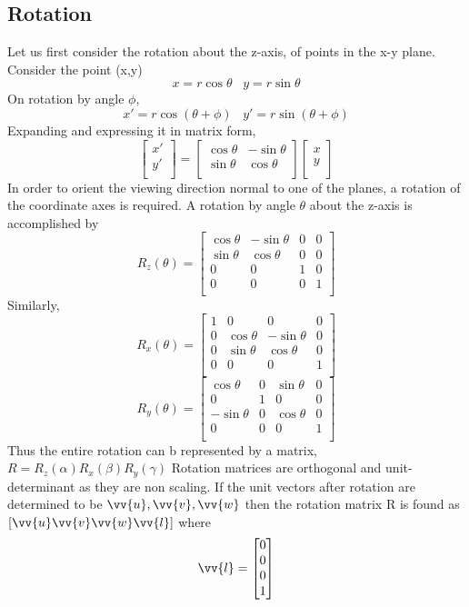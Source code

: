 \documentclass{article}
\begin{document}
\subsection{Rotation}
Let us first consider the rotation about the z-axis, of points in the x-y plane. Consider the point (x,y) 
\[x = r\cos{\theta} \,\,\,\,\, y = r\sin{\theta}\]
On rotation by angle $\phi$,
\[x' = r\cos{(\theta + \phi)} \,\,\,\,\, y' = r\sin{(\theta + \phi)}\]
Expanding and expressing it in matrix form,
\[\begin{bmatrix}
x'\\y'\\\end{bmatrix} = \begin{bmatrix}\cos{\theta}&-\sin{\theta}\\\sin{\theta}&\cos{\theta}\\\end{bmatrix}\begin{bmatrix}x\\y\\\end{bmatrix}\]
In order to orient the viewing direction normal to one of the planes, a rotation of the coordinate axes is required. A rotation by angle $\theta$ about the z-axis is accomplished by
\[R_z(\theta) = \begin{bmatrix}
\cos{\theta}&-\sin{\theta}&0&0\\
\sin{\theta}&\cos{\theta}&0&0\\
0&0&1&0\\
0&0&0&1\\
\end{bmatrix}\]
Similarly, 
\[R_x(\theta) = \begin{bmatrix}
1&0&0&0\\
0&\cos{\theta}&-\sin{\theta}&0\\
0&\sin{\theta}&\cos{\theta}&0\\
0&0&0&1\\
\end{bmatrix}\]
\[R_y(\theta) = \begin{bmatrix}
\cos{\theta}&0&\sin{\theta}&0\\
0&1&0&0\\
-\sin{\theta}&0&\cos{\theta}&0\\
0&0&0&1\\
\end{bmatrix}\]
Thus the entire rotation can b represented by a matrix, $R = R_z(\alpha) R_x(\beta) R_y(\gamma)$
Rotation matrices are orthogonal and unit-determinant as they are non scaling. If the unit vectors after rotation are determined to be $\vv{u}, \vv{v}, \vv{w}$ then the rotation matrix R is found as $[ \vv{u} \vv{v} \vv{w} \vv{l} ]$ where 
\[\vv{l} = \begin{bmatrix}
0\\
0\\
0\\
1\\
\end{bmatrix}\]
\end{document}
